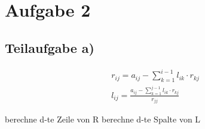 \section*{Aufgabe 2}
\subsection*{Teilaufgabe a)}
\begin{align}
	r_{ij} = a_{ij} - \sum_{k=1}^{i-1} l_{ik} \cdot r_{kj} \\
	l_{ij} = \frac{a_{ij} - \sum_{k=1}^{j-1} l_{ik} \cdot r_{kj}}{r_{jj}}
\end{align}


\begin{algorithm}
    \begin{algorithmic}
    		\State berechne d-te Zeile von R
    		\State berechne d-te Spalte von L
	\EndFor
    \end{algorithmic}
\end{algorithm}

